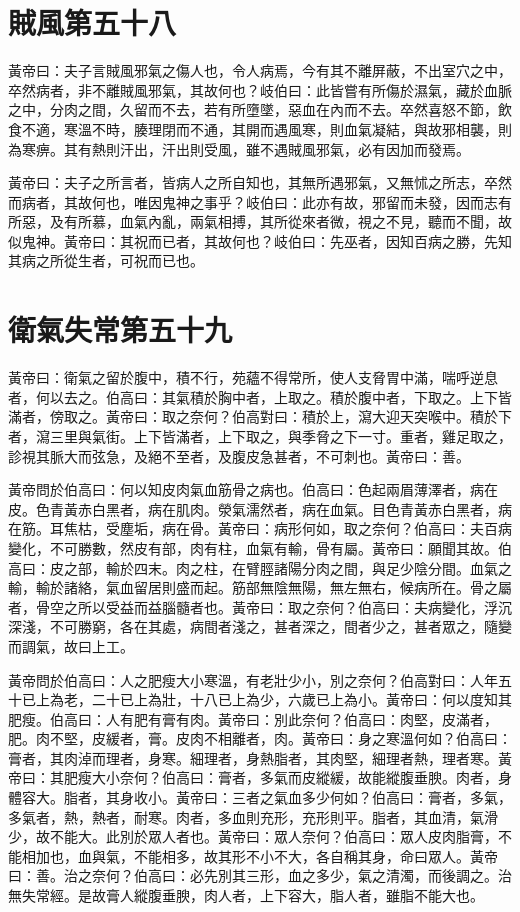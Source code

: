 \section{賊風第五十八}

黃帝曰：夫子言賊風邪氣之傷人也，令人病焉，今有其不離屏蔽，不出室穴之中，卒然病者，非不離賊風邪氣，其故何也？岐伯曰：此皆嘗有所傷於濕氣，藏於血脈之中，分肉之間，久留而不去，若有所墮墜，惡血在內而不去。卒然喜怒不節，飲食不適，寒溫不時，腠理閉而不通，其開而遇風寒，則血氣凝結，與故邪相襲，則為寒痹。其有熱則汗出，汗出則受風，雖不遇賊風邪氣，必有因加而發焉。

黃帝曰：夫子之所言者，皆病人之所自知也，其無所遇邪氣，又無怵之所志，卒然而病者，其故何也，唯因鬼神之事乎？岐伯曰：此亦有故，邪留而未發，因而志有所惡，及有所慕，血氣內亂，兩氣相搏，其所從來者微，視之不見，聽而不聞，故似鬼神。黃帝曰：其祝而已者，其故何也？岐伯曰：先巫者，因知百病之勝，先知其病之所從生者，可祝而已也。



\section{衛氣失常第五十九}

黃帝曰：衛氣之留於腹中，積不行，苑蘊不得常所，使人支脅胃中滿，喘呼逆息者，何以去之。伯高曰：其氣積於胸中者，上取之。積於腹中者，下取之。上下皆滿者，傍取之。黃帝曰：取之奈何？伯高對曰：積於上，瀉大迎天突喉中。積於下者，瀉三里與氣街。上下皆滿者，上下取之，與季脅之下一寸。重者，雞足取之，診視其脈大而弦急，及絕不至者，及腹皮急甚者，不可刺也。黃帝曰：善。

黃帝問於伯高曰：何以知皮肉氣血筋骨之病也。伯高曰：色起兩眉薄澤者，病在皮。色青黃赤白黑者，病在肌肉。滎氣濡然者，病在血氣。目色青黃赤白黑者，病在筋。耳焦枯，受塵垢，病在骨。黃帝曰：病形何如，取之奈何？伯高曰：夫百病變化，不可勝數，然皮有部，肉有柱，血氣有輸，骨有屬。黃帝曰：願聞其故。伯高曰：皮之部，輸於四末。肉之柱，在臂脛諸陽分肉之間，與足少陰分間。血氣之輸，輸於諸絡，氣血留居則盛而起。筋部無陰無陽，無左無右，候病所在。骨之屬者，骨空之所以受益而益腦髓者也。黃帝曰：取之奈何？伯高曰：夫病變化，浮沉深淺，不可勝窮，各在其處，病間者淺之，甚者深之，間者少之，甚者眾之，隨變而調氣，故曰上工。

黃帝問於伯高曰：人之肥瘦大小寒溫，有老壯少小，別之奈何？伯高對曰：人年五十已上為老，二十已上為壯，十八已上為少，六歲已上為小。黃帝曰：何以度知其肥瘦。伯高曰：人有肥有膏有肉。黃帝曰：別此奈何？伯高曰：肉堅，皮滿者，肥。肉不堅，皮緩者，膏。皮肉不相離者，肉。黃帝曰：身之寒溫何如？伯高曰：膏者，其肉淖而理者，身寒。細理者，身熱脂者，其肉堅，細理者熱，理者寒。黃帝曰：其肥瘦大小奈何？伯高曰：膏者，多氣而皮縱緩，故能縱腹垂腴。肉者，身體容大。脂者，其身收小。黃帝曰：三者之氣血多少何如？伯高曰：膏者，多氣，多氣者，熱，熱者，耐寒。肉者，多血則充形，充形則平。脂者，其血清，氣滑少，故不能大。此別於眾人者也。黃帝曰：眾人奈何？伯高曰：眾人皮肉脂膏，不能相加也，血與氣，不能相多，故其形不小不大，各自稱其身，命曰眾人。黃帝曰：善。治之奈何？伯高曰：必先別其三形，血之多少，氣之清濁，而後調之。治無失常經。是故膏人縱腹垂腴，肉人者，上下容大，脂人者，雖脂不能大也。



